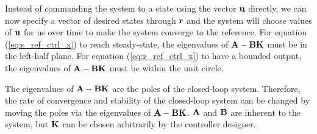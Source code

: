 Instead of commanding the system to a state using the vector $\mathbf{u}$ directly,
we can now specify a vector of desired states through $\mathbf{r}$ and the system
will choose values of $\mathbf{u}$ for us over time to make the system converge to
the reference. For equation (\ref{eq:s_ref_ctrl_x}) to reach steady-state, the
eigenvalues of $\mathbf{A} - \mathbf{B}\mathbf{K}$ must be in the left-half plane. For
equation (\ref{eq:z_ref_ctrl_x}) to have a bounded output, the eigenvalues of
$\mathbf{A} - \mathbf{B}\mathbf{K}$ must be within the unit circle.

The eigenvalues of $\mathbf{A} - \mathbf{B}\mathbf{K}$ are the poles of the closed-loop
system. Therefore, the rate of convergence and stability of the closed-loop
system can be changed by moving the poles via the eigenvalues of
$\mathbf{A} - \mathbf{B}\mathbf{K}$. $\mathbf{A}$ and $\mathbf{B}$ are inherent to the system,
but $\mathbf{K}$ can be chosen arbitrarily by the controller designer.
